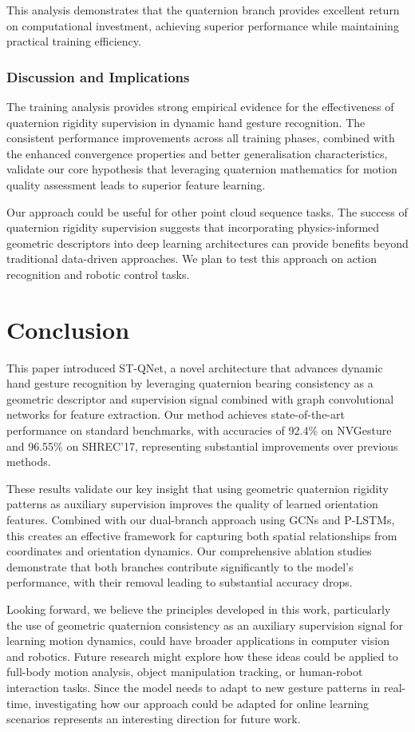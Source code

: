 \documentclass[journal]{IEEEtran}
\theoremstyle{plain}
\begin{document}
This analysis demonstrates that the quaternion branch provides excellent return on computational investment, achieving superior performance while maintaining practical training efficiency.

\subsubsection{Discussion and Implications}
The training analysis provides strong empirical evidence for the effectiveness of quaternion rigidity supervision in dynamic hand gesture recognition. The consistent performance improvements across all training phases, combined with the enhanced convergence properties and better generalisation characteristics, validate our core hypothesis that leveraging quaternion mathematics for motion quality assessment leads to superior feature learning.

Our approach could be useful for other point cloud sequence tasks. The success of quaternion rigidity supervision suggests that incorporating physics-informed geometric descriptors into deep learning architectures can provide benefits beyond traditional data-driven approaches. We plan to test this approach on action recognition and robotic control tasks.

\section{Conclusion}\label{sec:conclusion}
This paper introduced ST-QNet, a novel architecture that advances dynamic hand gesture recognition by leveraging quaternion bearing consistency as a geometric descriptor and supervision signal combined with graph convolutional networks for feature extraction. Our method achieves state-of-the-art performance on standard benchmarks, with accuracies of 92.4\% on NVGesture and 96.55\% on SHREC'17, representing substantial improvements over previous methods.

These results validate our key insight that using geometric quaternion rigidity patterns as auxiliary supervision improves the quality of learned orientation features. Combined with our dual-branch approach using GCNs and P-LSTMs, this creates an effective framework for capturing both spatial relationships from coordinates and orientation dynamics. Our comprehensive ablation studies demonstrate that both branches contribute significantly to the model's performance, with their removal leading to substantial accuracy drops.

Looking forward, we believe the principles developed in this work, particularly the use of geometric quaternion consistency as an auxiliary supervision signal for learning motion dynamics, could have broader applications in computer vision and robotics. Future research might explore how these ideas could be applied to full-body motion analysis, object manipulation tracking, or human-robot interaction tasks. Since the model needs to adapt to new gesture patterns in real-time, investigating how our approach could be adapted for online learning scenarios represents an interesting direction for future work.

\end{document}
